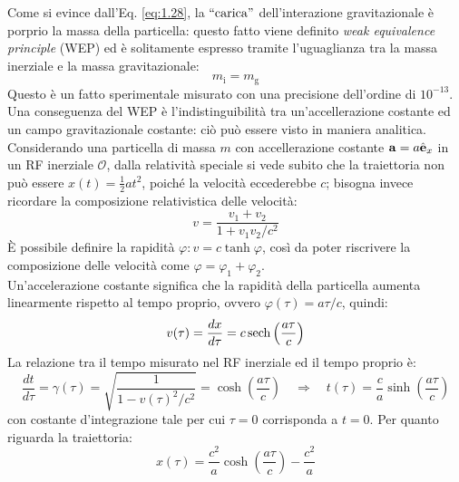 Come si evince dall'Eq. \ref{eq:1.28}, la $ ``\text{carica}" $ dell'interazione gravitazionale è porprio la massa della particella: questo fatto viene definito \textit{weak equivalence principle} (WEP) ed è solitamente espresso tramite l'uguaglianza tra la massa inerziale e la massa gravitazionale:
\begin{equation}
  m_{\text{i}} = m_{\text{g}}
  \label{eq:1.30}
\end{equation}
Questo è un fatto sperimentale misurato con una precisione dell'ordine di $ 10^{-13} $.\\
Una conseguenza del WEP è l'indistinguibilità tra un'accellerazione costante ed un campo gravitazionale costante: ciò può essere visto in maniera analitica.\\
Considerando una particella di massa $ m $ con accellerazione costante $ \mathbf{a} = a \hat{\mathbf{e}}_x $ in un RF inerziale $ \mathcal{O} $, dalla relatività speciale si vede subito che la traiettoria non può essere $ x(t) = \frac{1}{2} at^2 $, poiché la velocità eccederebbe $ c $; bisogna invece ricordare la composizione relativistica delle velocità:
\begin{equation}
  v = \frac{v_1 + v_2}{1 + v_1 v_2 / c^2}
  \label{eq:1.31}
\end{equation}
È possibile definire la rapidità $ \varphi : v = c \tanh\varphi $, così da poter riscrivere la composizione delle velocità come $ \varphi = \varphi_1 + \varphi_2 $.\\
Un'accelerazione costante significa che la rapidità della particella aumenta linearmente rispetto al tempo proprio, ovvero $ \varphi(\tau) = a\tau/c $, quindi:
\begin{equation}
  v(\tau) = \frac{dx}{d\tau} = c \operatorname{sech} \left( \frac{a\tau}{c} \right)
  \label{eq:1.32}
\end{equation}
La relazione tra il tempo misurato nel RF inerziale ed il tempo proprio è:
\begin{equation}
  \frac{dt}{d\tau} = \gamma(\tau) = \sqrt{\frac{1}{1 - v(\tau)^2 / c^2}} = \cosh \left( \frac{a\tau}{c} \right) \quad\Longrightarrow\quad t(\tau) = \frac{c}{a} \sinh \left( \frac{a\tau}{c} \right)
  \label{eq:1.33}
\end{equation}
con costante d'integrazione tale per cui $ \tau = 0 $ corrisponda a $ t = 0 $. Per quanto riguarda la traiettoria:
\begin{equation}
  x(\tau) = \frac{c^2}{a} \cosh \left( \frac{a\tau}{c} \right) - \frac{c^2}{a}
  \label{eq:1.34}
\end{equation}
